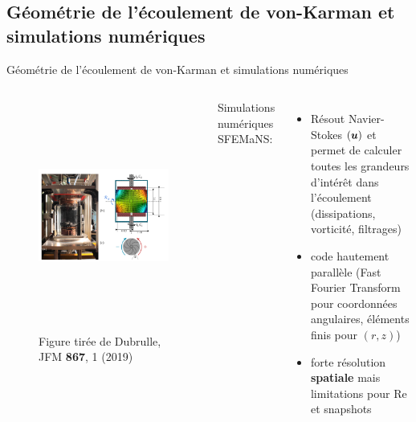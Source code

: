 \documentclass[aspectratio=169,usenames,dvipsnames]{beamer}
\begin{document}
\subsection{Géométrie de l'écoulement de von-Karman et simulations numériques}
\begin{frame}{Géométrie de l'écoulement de von-Karman et simulations numériques}
\begin{columns}
\begin{figure}[h]
    \centering
    \includegraphics[height=0.7\textwidth]{figs/geometrie_vk.png}
    \caption{Figure tirée de {\color{blue}Dubrulle, JFM {\bf 867}, 1 (2019)}}
\end{figure}\pause
{}
\centering Simulations numériques SFEMaNS\pause: 
\begin{itemize}[label=]
    \item {\small Résout Navier-Stokes $(\boldsymbol{u})$ et permet de calculer toutes les grandeurs
          d'intérêt dans l'écoulement (dissipations, vorticité, filtrages)}\pause
    \item {\small code hautement parallèle (Fast Fourier Transform pour coordonnées angulaires, 
          éléments finis pour $(r,z)$)}\pause
    \item {\small forte résolution {\bf spatiale} mais limitations pour Re et snapshots}
\end{itemize}
\end{columns}
\end{frame}
\end{document}
